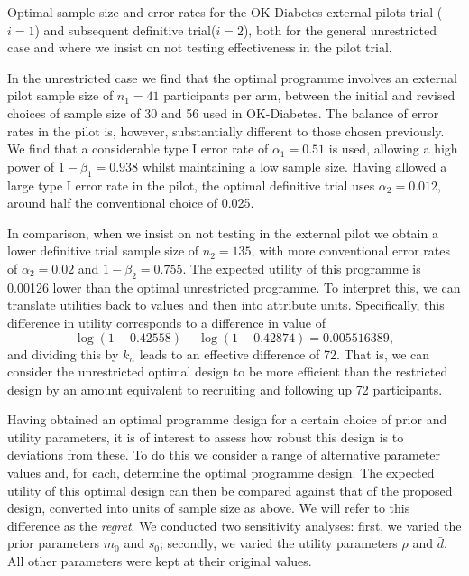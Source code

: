 \documentclass[sagev, Crown]{sagej}
\begin{document}
\begin{table}
\small\sf\centering
\caption{Optimal sample size and error rates for the OK-Diabetes external pilots trial ($i = 1$) and subsequent definitive trial($i = 2$), both for the general unrestricted case and where we insist on not testing effectiveness in the pilot trial.}

\label{tab:ill}
\end{table}

In the unrestricted case we find that the optimal programme involves an external pilot sample size of $n_1 = 41$ participants per arm, between the initial and revised choices of sample size of 30 and 56 used in OK-Diabetes. The balance of error rates in the pilot is, however, substantially different to those chosen previously. We find that a considerable type I error rate of $\alpha_1 = 0.51$ is used, allowing a high power of $1-\beta_1 = 0.938$ whilst maintaining a low sample size. Having allowed a large type I error rate in the pilot, the optimal definitive trial uses $\alpha_2 = 0.012$, around half the conventional choice of 0.025. 

In comparison, when we insist on not testing in the external pilot we obtain a lower definitive trial sample size of $n_2 = 135$, with more conventional error rates of $\alpha_2 = 0.02$ and $1 - \beta_2 = 0.755$. The expected utility of this programme is 0.00126 lower than the optimal unrestricted programme. To interpret this, we can translate utilities back to values and then into attribute units. Specifically, this difference in utility corresponds to a difference in value of
$$
\log(1-0.42558) - \log(1-0.42874) = 0.005516389,
$$
and dividing this by $k_n$ leads to an effective difference of 72. That is, we can consider the unrestricted optimal design to be more efficient than the restricted design by an amount equivalent to recruiting and following up 72 participants.


Having obtained an optimal programme design for a certain choice of prior and utility parameters, it is of interest to assess how robust this design is to deviations from these. To do this we consider a range of alternative parameter values and, for each, determine the optimal programme design. The expected utility of this optimal design can then be compared against that of the proposed design, converted into units of sample size as above. We will refer to this difference as the \emph{regret}. We conducted two sensitivity analyses: first, we varied the prior parameters $m_0$ and $s_0$; secondly, we varied the utility parameters $\rho$ and $\bar{d}$. All other parameters were kept at their original values.
\end{document}
